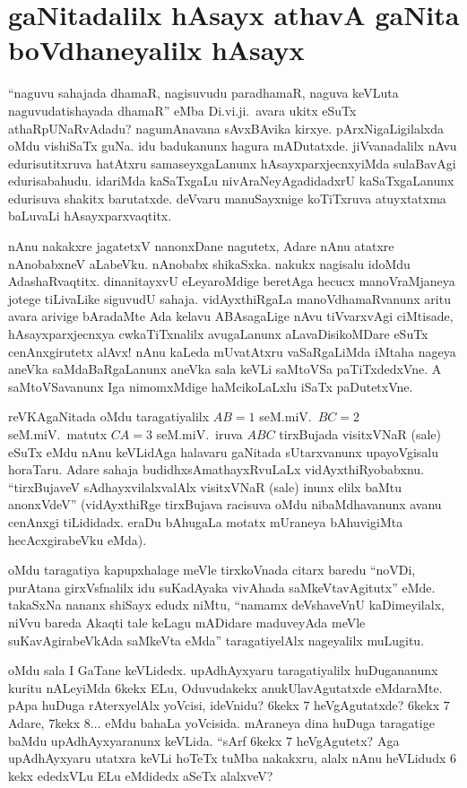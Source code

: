 \chapter{gaNitadalilx hAsayx athavA gaNita boVdhaneyalilx hAsayx}\label{chap14}

\qquad ``naguvu sahajada dhamaR, nagisuvudu paradhamaR, naguva keVLuta naguvu\-datishayada dhamaR'' eMba Di.vi.ji.\ avara ukitx eSuTx athaRpUNaRvAdadu? nagu\break mAnavana sAvxBAvika kirxye. pArxNigaLigilalxda oMdu vishiSaTx guNa. idu \hbox{badukanunx} hagura mADutatxde. jiVvanadalilx nAvu edurisutitxruva hatAtxru samaseyxgaLanunx hAsayxparxjecnxyiMda sulaBavAgi edurisabahudu. idariMda kaSaTxgaLu nivAraNeyAga\break didadxrU kaSaTxgaLanunx edurisuva shakitx barutatxde. deVvaru manuSayxnige koTiTxruva atuyxtatxma baLuvaLi hAsayxparxvaqtitx.

nAnu nakakxre jagatetxV nanonxDane nagutetx, Adare nAnu atatxre nAnobabxneV aLabeVku. nAnobabx shikaSxka. nakukx nagisalu idoMdu AdashaRvaqtitx. dinanitayxvU eLeyaroMdige beretAga hecucx manoVraMjaneya jotege tiLivaLike siguvudU sahaja. vidAyxthiRgaLa manoVdhamaRvanunx aritu avara arivige bAradaMte Ada kelavu ABAsagaLige nAvu tiVvarxvAgi ciMtisade, hAsayxparxjecnxya cwkaTiTxnalilx avugaLanunx aLavaDisikoMDare eSuTx cenAnxgirutetx alAvx! nAnu kaLeda mUvatAtxru vaSaRgaLiMda iMtaha nageya aneVka saMdaBaRgaLanunx aneVka sala keVLi saMtoVSa paTiTxdedxVne. A saMtoVSavanunx Iga nimomxMdige haMcikoLaLxlu iSaTx paDutetxVne.

\eject

reVKAgaNitada oMdu taragatiyalilx $AB=1$ seM.miV.\ $BC=2$ seM.miV.\ matutx $CA=3$ seM.miV.\ iruva $ABC$ tirxBujada visitxVNaR (sale) eSuTx eMdu nAnu keVLidAga halavaru gaNitada sUtarxvanunx upayoVgisalu horaTaru. Adare sahaja budidhxsAmathayxRvuLaLx vidAyxthiRyobabxnu. ``tirxBujaveV sAdhayxvilalxvalAlx visitxVNaR (sale) inunx elilx baMtu anonxVdeV'' (vidAyxthiRge tirxBujava racisuva oMdu nibaMdhavanunx avanu cenAnxgi tiLididadx. eraDu bAhugaLa motatx mUraneya bAhuvigiMta hecAcxgirabeVku eMda).

oMdu taragatiya kapupxhalage meVle tirxkoVnada citarx baredu ``noVDi, purAtana girxVsfnalilx idu suKadAyaka vivAhada saMkeVtavAgitutx'' eMde. takaSxNa nananx shiSayx edudx niMtu, ``namamx deVshaveVnU kaDimeyilalx, niVvu bareda Akaqti tale keLagu mADidare maduveyAda meVle suKavAgirabeVkAda saMkeVta eMda'' taragatiyelAlx nageyalilx muLugitu.

oMdu sala I GaTane keVLidedx. upAdhAyxyaru taragatiyalilx huDugananunx kuritu nALeyiMda $6$kekx ELu, Oduvudakekx anukUlavAgutatxde eMdaraMte. pApa huDuga rAterxyelAlx yoVcisi, ideVnidu? $6$kekx $7$ heVgAgutatxde? $6$kekx $7$ Adare, $7$kekx $8\ldots$ eMdu bahaLa yoVcisida. mAraneya dina huDuga taragatige baMdu upAdhAyxyaranunx keVLida. ``sArf $6$kekx $7$ heVgAgutetx? Aga upAdhAyxyaru utatxra keVLi hoTeTx tuMba nakakxru, alalx nAnu heVLidudx $6$kekx ededxVLu  ELu eMdidedx aSeTx alalxveV?

